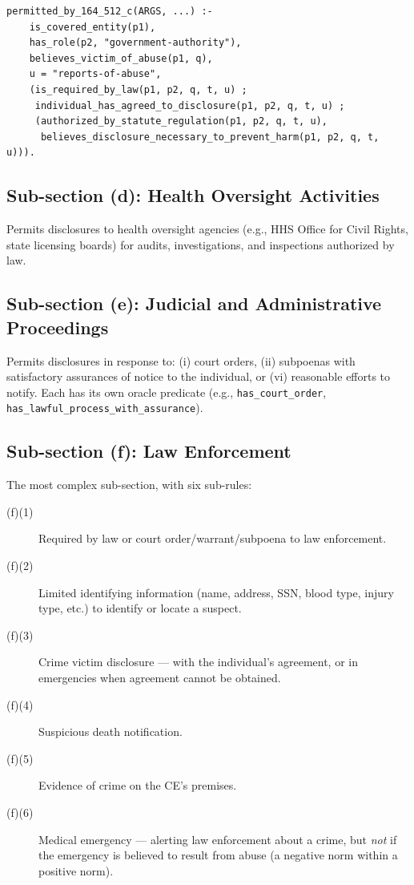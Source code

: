 \documentclass[11pt,letterpaper]{article}
\begin{document}
\begin{lstlisting}[style=soufflestyle,caption={\S 512(c): Three alternative conditions combined with ;\ (OR)}]
permitted_by_164_512_c(ARGS, ...) :-
    is_covered_entity(p1),
    has_role(p2, "government-authority"),
    believes_victim_of_abuse(p1, q),
    u = "reports-of-abuse",
    (is_required_by_law(p1, p2, q, t, u) ;
     individual_has_agreed_to_disclosure(p1, p2, q, t, u) ;
     (authorized_by_statute_regulation(p1, p2, q, t, u),
      believes_disclosure_necessary_to_prevent_harm(p1, p2, q, t, u))).
\end{lstlisting}

\subsection{Sub-section (d): Health Oversight Activities}

Permits disclosures to health oversight agencies (e.g., HHS Office for Civil Rights, state licensing boards) for audits, investigations, and inspections authorized by law.

\subsection{Sub-section (e): Judicial and Administrative Proceedings}

Permits disclosures in response to: (i) court orders, (ii) subpoenas with satisfactory assurances of notice to the individual, or (vi) reasonable efforts to notify. Each has its own oracle predicate (e.g., \texttt{has\_court\_order}, \texttt{has\_lawful\_process\_with\_assurance}).

\subsection{Sub-section (f): Law Enforcement}

The most complex sub-section, with six sub-rules:

\begin{description}
  \item[(f)(1)] Required by law or court order/warrant/subpoena to law enforcement.
  \item[(f)(2)] Limited identifying information (name, address, SSN, blood type, injury type, etc.) to identify or locate a suspect.
  \item[(f)(3)] Crime victim disclosure --- with the individual's agreement, or in emergencies when agreement cannot be obtained.
  \item[(f)(4)] Suspicious death notification.
  \item[(f)(5)] Evidence of crime on the CE's premises.
  \item[(f)(6)] Medical emergency --- alerting law enforcement about a crime, but \emph{not} if the emergency is believed to result from abuse (a negative norm within a positive norm).
\end{description}
\end{document}
